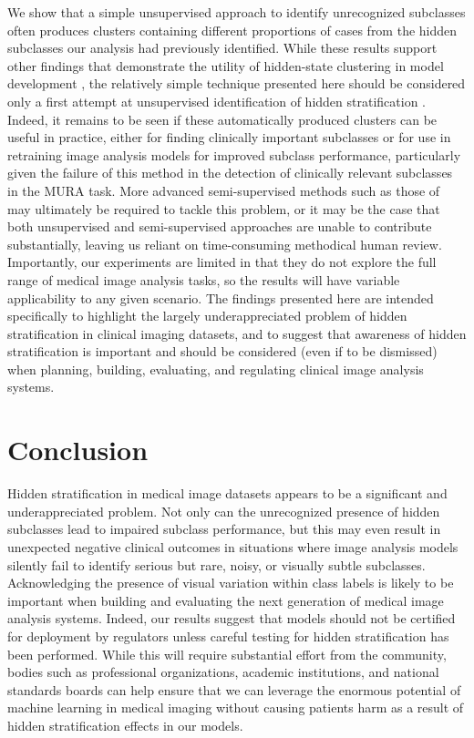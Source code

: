 \documentclass[sigconf,anonymous,review]{acmart}
\begin{document}
We show that a simple unsupervised approach to identify unrecognized subclasses often produces clusters containing different proportions of cases from the hidden subclasses our analysis had previously identified. 
While these results support other findings that demonstrate the utility of hidden-state clustering in model development \citep{Liu2019-qt}, the relatively simple technique presented here should be considered only a first attempt at unsupervised identification of hidden stratification \citep{calinski1974dendrite, rousseeuw1987silhouettes}. 
Indeed, it remains to be seen if these automatically produced clusters can be useful in practice, either for finding clinically important subclasses or for use in retraining image analysis models for improved subclass performance, particularly given the failure of this method in the detection of clinically relevant subclasses in the MURA task. 
More advanced semi-supervised methods such as those of \citep{chen2019slicing} may ultimately be required to tackle this problem, or it may be the case that both unsupervised and semi-supervised approaches are unable to contribute substantially, leaving us reliant on time-consuming methodical human review.
Importantly, our experiments are limited in that they do not explore the full range of medical image analysis tasks, so the results will have variable applicability to any given scenario.
The findings presented here are intended specifically to highlight the largely underappreciated problem of hidden stratification in clinical imaging datasets, and to suggest that awareness of hidden stratification is important and should be considered (even if to be dismissed) when planning, building, evaluating, and regulating clinical image analysis systems.
 
\section{Conclusion}

Hidden stratification in medical image datasets appears to be a significant and underappreciated problem. 
Not only can the unrecognized presence of hidden subclasses lead to impaired subclass performance, but this may even result in unexpected negative clinical outcomes in situations where image analysis models silently fail to identify serious but rare, noisy, or visually subtle subclasses.
Acknowledging the presence of visual variation within class labels is likely to be important when building and evaluating the next generation of medical image analysis systems.
Indeed, our results suggest that models should not be certified for deployment by regulators unless careful testing for hidden stratification has been performed.
While this will require substantial effort from the community, bodies such as professional organizations, academic institutions, and national standards boards can help ensure that we can leverage the enormous potential of machine learning in medical imaging without causing patients harm as a result of hidden stratification effects in our models.
\end{document}
